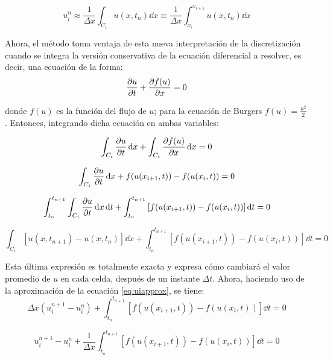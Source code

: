 \documentclass[12pt]{article}
\begin{document}
	\begin{equation}
		u_{i}^{n} \approx \frac{1}{\Delta x} \int_{C_i} u(x,t_n) \dd{x} \equiv \frac{1}{\Delta x} \int_{x_i}^{x_{i+1}} u(x,t_n) \dd{x}
		\label{eq:uiapprox}
	\end{equation}
	
	Ahora, el método toma ventaja de esta nueva interpretación de la discretización cuando se integra la versión conservativa de la ecuación diferencial a resolver, es decir, una ecuación de la forma:
	\begin{equation}
		\pdv{u}{t} + \pdv{f(u)}{x} = 0
		\label{eq:conservative_general}
	\end{equation}
	
	donde $f(u)$ es la función del flujo de $u$; para la ecuación de Burgers $f(u) = \frac{u^2}{2}$. Entonces, integrando dicha ecuación en ambas variables:
	
	\begin{equation}
		\int_{C_i} \pdv{u}{t} \dd{x} + \int_{C_i} \pdv{f(u)}{x} \dd{x} = 0
		\label{eq:ecuacion-integrada}
	\end{equation}

	\begin{equation}
		\int_{C_i} \pdv{u}{t} \dd{x} + f(u(x_{i+1} ,t)) - f(u(x_{i},t)) = 0
	\end{equation}

	\begin{equation}
		\int_{t_n}^{t_{n+1}} \int_{C_i} \pdv{u}{t} \dd{x} \dd{t} + \int_{t_n}^{t_{n+1}}\left[ f(u(x_{i+1} ,t)) - f(u(x_{i},t))\right]\dd{t} = 0
	\end{equation}

	\begin{equation}
		\int_{C_i} \left[u(x, t_{n+1}) - u(x, t_n)\right] \dd{x} + \int_{t_n}^{t_{n+1}}\left[ f(u(x_{i+1} ,t)) - f(u(x_{i},t))\right]\dd{t} = 0 
	\end{equation}
	
	Esta última expresión es totalmente exacta y expresa cómo cambiará el valor promedio de $u$ en cada celda, después de un instante $\Delta t$. Ahora, haciendo uso de la aproximación de la ecuación \ref{eq:uiapprox}, se tiene:
	\begin{equation}
		 \Delta x\left( u_{i}^{n+1} - u_{i}^{n}\right)   + \int_{t_n}^{t_{n+1}}\left[ f(u(x_{i+1} ,t)) - f(u(x_{i},t))\right]\dd{t} = 0 
	\end{equation}

	\begin{equation}
		u_{i}^{n+1} - u_{i}^{n} + \frac{1}{\Delta x}\int_{t_n}^{t_{n+1}}\left[ f(u(x_{i+1} ,t)) - f(u(x_{i},t))\right]\dd{t} = 0 
	\end{equation}
\end{document}
